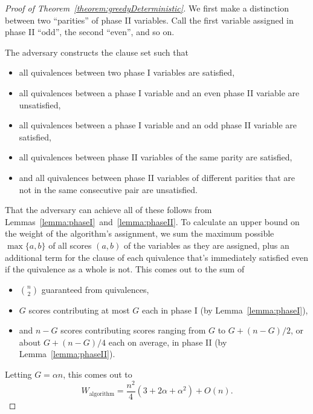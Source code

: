 \documentclass[11pt,letter]{article}
\numberwithin{theorem}{section}
\begin{document}
\begin{proof}[Proof of Theorem~\ref{theorem:greedyDeterministic}]
  We first make a distinction between two ``parities'' of phase II variables.
  Call the first variable assigned in phase II ``odd'',
  the second ``even'', and so on.

  The adversary constructs the clause set such that
  \begin{itemize}
  \item
    all quivalences between two phase I variables are satisfied,
  \item
    all quivalences between
    a phase I variable and an even phase II variable are unsatisfied,
  \item
    all quivalences between
    a phase I variable and an odd phase II variable are satisfied,
  \item
    all quivalences between
    phase II variables of the same parity are satisfied,
  \item
    and all quivalences between
    phase II variables of different parities
    that are not in the same consecutive pair
    are unsatisfied.
  \end{itemize}
  That the adversary can achieve all of these follows from
  Lemmas~\ref{lemma:phaseI}~and~\ref{lemma:phaseII}.
  To calculate an upper bound on the weight of the algorithm's assignment,
  we sum the maximum possible $\max\{a,b\}$
  of all scores $(a,b)$ of the variables as they are assigned,
  plus an additional term for the clause of each quivalence
  that's immediately satisfied even if the quivalence as a whole is not.
  This comes out to the sum of
  \begin{itemize}
  \item
    $\binom{n}{2}$ guaranteed from quivalences,
  \item
    $G$ scores contributing at most $G$ each
    in phase I (by Lemma~\ref{lemma:phaseI}),
  \item
    and $n-G$ scores contributing scores ranging from $G$ to $G + (n-G)/2$,
    or about $G + (n-G)/4$ each on average,
    in phase II (by Lemma~\ref{lemma:phaseII}).
  \end{itemize}
  Letting $G = \alpha n$, this comes out to
  \[
    W_\textrm{algorithm} = \frac{n^2}{4}(3 + 2\alpha + \alpha^2) + O(n).
  \]


\end{proof}
\end{document}

